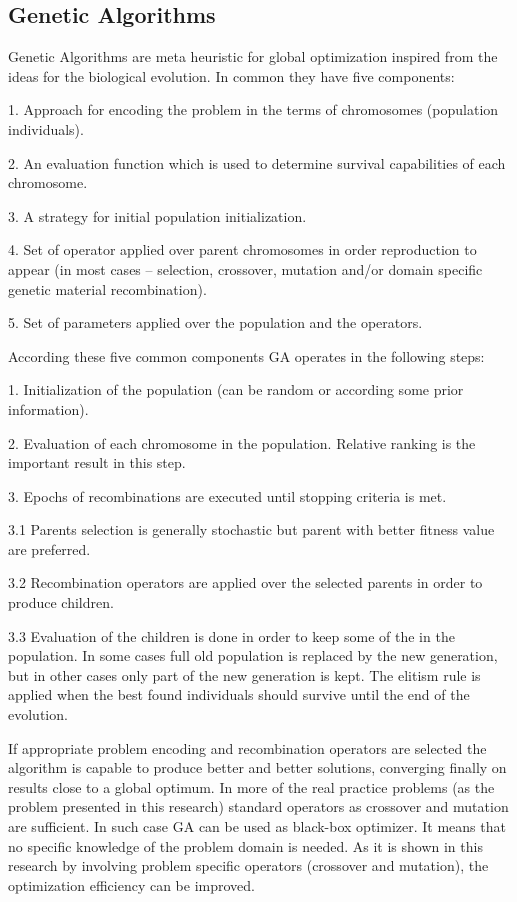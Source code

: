 \documentclass{llncs}
\begin{document}
\subsection{Genetic Algorithms}
%
Genetic Algorithms are meta heuristic for global optimization inspired from the ideas for the biological evolution. In common they have five components:

1. Approach for encoding the problem in the terms of chromosomes (population individuals).

2. An evaluation function which is used to determine survival capabilities of each chromosome.

3. A strategy for initial population initialization.

4. Set of operator applied over parent chromosomes in order reproduction to appear (in most cases – selection, crossover, mutation and/or domain specific genetic material recombination).

5. Set of parameters applied over the population and the operators.

\vspace{4 mm}

According these five common components GA operates in the following steps:

1. Initialization of the population (can be random or according some prior information).

2. Evaluation of each chromosome in the population. Relative ranking is the important result in this step.

3. Epochs of recombinations are executed until stopping criteria is met.

  \hspace{4 mm}3.1 Parents selection is generally stochastic but parent with better fitness value are preferred.
  
  \hspace{4 mm}3.2 Recombination operators are applied over the selected parents in order to produce children.
  
  \hspace{4 mm}3.3 Evaluation of the children is done in order to keep some of the in the population. In some cases full old population is replaced by the new generation, but in other cases only part of the new generation is kept. The elitism rule is applied when the best found individuals should survive until the end of the evolution.

If appropriate problem encoding and recombination operators are selected the algorithm is capable to produce better and better solutions, converging finally on results close to a global optimum. In more of the real practice problems (as the problem presented in this research) standard operators as crossover and mutation are sufficient. In such case GA can be used as black-box optimizer. It means that no specific knowledge of the problem domain is needed. As it is shown in this research by involving problem specific operators (crossover and mutation), the optimization efficiency can be improved. 
\end{document}

